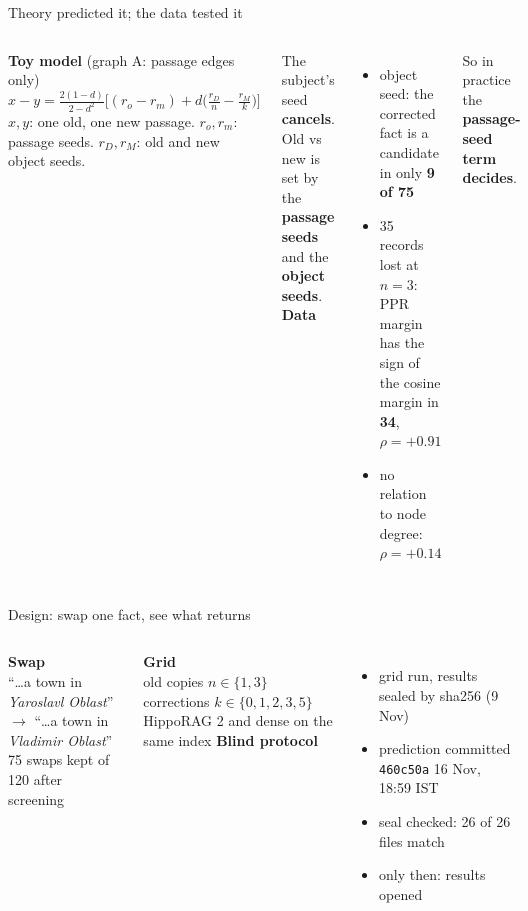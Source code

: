 \documentclass[aspectratio=169,12pt]{beamer}
\newcommand{\quiet}[1]{{\color{muted}\small #1}}
\begin{document}
\begin{frame}{Theory predicted it; the data tested it}
\begin{columns}[T]
\textbf{Toy model} \quiet{(graph A: passage edges only)}
\[x - y = \tfrac{2(1-d)}{2-d^2}\Big[(r_o - r_m) + d\Big(\tfrac{r_D}{n} - \tfrac{r_M}{k}\Big)\Big]\]
\quiet{$x, y$: one old, one new passage. $r_o, r_m$: passage seeds. $r_D, r_M$: old and new object seeds.}

\vspace{0.5em}
The subject's seed \textbf{cancels}. Old vs new is set by the \textbf{passage seeds} and the \textbf{object seeds}.
\textbf{Data}
\begin{itemize}
\item object seed: the corrected fact is a candidate in only \textbf{9 of 75}
\item 35 records lost at $n = 3$: PPR margin has the sign of the cosine margin in \textbf{34}, $\rho = +0.91$
\item no relation to node degree: $\rho = +0.14$
\end{itemize}
\vspace{0.4em}
So in practice the {\color{accent}\bfseries passage-seed term decides}.
\end{columns}
\end{frame}

\begin{frame}{Design: swap one fact, see what returns}
\begin{columns}[T]
\textbf{Swap}\\
``\ldots a town in \emph{Yaroslavl Oblast}''\\
$\rightarrow$ ``\ldots a town in {\color{accent}\emph{Vladimir Oblast}}''\\[0.2em]
\quiet{75 swaps kept of 120 after screening}

\vspace{0.9em}
\textbf{Grid}\\
old copies $n \in \{1, 3\}$\\
corrections $k \in \{0, 1, 2, 3, 5\}$\\
\quiet{HippoRAG 2 and dense on the same index}
\textbf{Blind protocol}
\begin{itemize}
\item grid run, results sealed by sha256 \quiet{(9 Nov)}
\item prediction committed\\{\color{accent}\texttt{460c50a}} \quiet{16 Nov, 18:59 IST}
\item seal checked: 26 of 26 files match
\item only then: results opened
\end{itemize}
\end{columns}
\end{frame}
\end{document}
